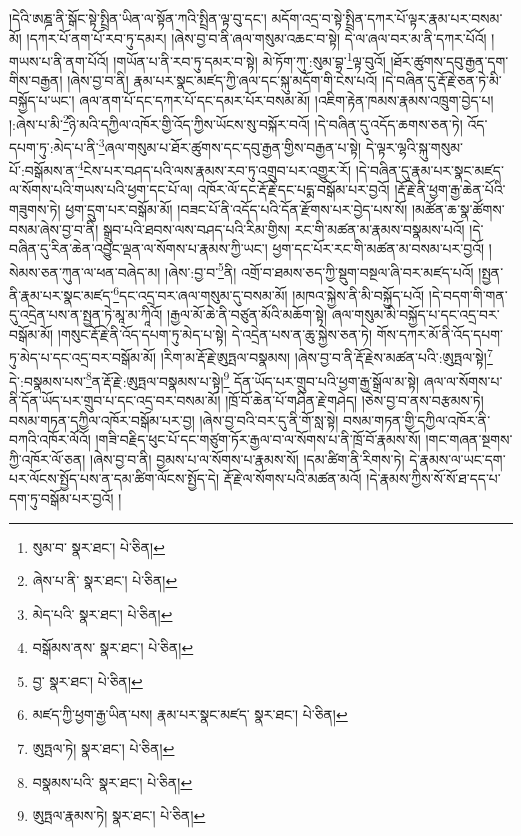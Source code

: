 །དེའི་ཨཎྜ་ནི་སྒོང་སྟེ་སྤྲིན་ཡིན་ལ་སྟོན་ཀའི་སྤྲིན་ལྟ་བུ་དང་། མདོག་འདྲ་བ་སྟེ་སྤྲིན་དཀར་པོ་ལྟར་རྣམ་པར་བསམ་མོ། །དཀར་པོ་ནག་པོ་རབ་ཏུ་དམར། །ཞེས་བྱ་བ་ནི་ཞལ་གསུམ་འཆང་བ་སྟེ། དེ་ལ་ཞལ་བར་མ་ནི་དཀར་པོའོ། །གཡས་པ་ནི་ནག་པོའོ། །གཡོན་པ་ནི་རབ་ཏུ་དམར་བ་སྟེ། མེ་ཏོག་ཀུ་:སུམ་བྷ་\footnote{སུམ་བ་  སྣར་ཐང་།  པེ་ཅིན། }ལྟ་བུའོ། །ཐོར་ཚུགས་དབུ་རྒྱན་དག་གིས་བརྒྱན། །ཞེས་བྱ་བ་ནི། རྣམ་པར་སྣང་མཛད་ཀྱི་ཞལ་དང་སྐུ་མདོག་གི་ངེས་པའོ། །དེ་བཞིན་དུ་རྡོ་རྗེ་ཅན་ཏེ་མི་བསྐྱོད་པ་ཡང་། ཞལ་ནག་པོ་དང་དཀར་པོ་དང་དམར་པོར་བསམ་མོ། །འཇིག་རྟེན་ཁམས་རྣམས་འཁྲུག་བྱེད་པ། །:ཞེས་པ་མི་\footnote{ཞེས་པ་ནི་  སྣར་ཐང་།  པེ་ཅིན། }ཉི་མའི་དཀྱིལ་འཁོར་གྱི་འོད་ཀྱིས་ཡོངས་སུ་བསྐོར་བའོ། །དེ་བཞིན་དུ་འདོད་ཆགས་ཅན་ཏེ། འོད་དཔག་ཏུ་:མེད་པ་ནི་\footnote{མེད་པའི་  སྣར་ཐང་།  པེ་ཅིན། }ཞལ་གསུམ་པ་ཐོར་ཚུགས་དང་དབུ་རྒྱན་གྱིས་བརྒྱན་པ་སྟེ། དེ་ལྟར་ལྷའི་སྐུ་གསུམ་པོ་:བསྒོམས་ན་\footnote{བསྒོམས་ནས་  སྣར་ཐང་།  པེ་ཅིན། }ངེས་པར་བཤད་པའི་ལས་རྣམས་རབ་ཏུ་འགྲུབ་པར་འགྱུར་རོ། །དེ་བཞིན་དུ་རྣམ་པར་སྣང་མཛད་ལ་སོགས་པའི་གཡས་པའི་ཕྱག་དང་པོ་ལ། འཁོར་ལོ་དང་རྡོ་རྗེ་དང་པདྨ་བསྒོམ་པར་བྱའོ། །རྡོ་རྗེ་ནི་ཕྱག་རྒྱ་ཆེན་པོའི་གཟུགས་ཏེ། ཕྱག་དྲུག་པར་བསྒོམ་མོ། །བཟང་པོ་ནི་འདོད་པའི་དོན་རྫོགས་པར་བྱེད་པས་སོ། །མཚོན་ཆ་སྣ་ཚོགས་བསམ་ཞེས་བྱ་བ་ནི། སྒྲུབ་པའི་ཐབས་ལས་བཤད་པའི་རིམ་གྱིས། རང་གི་མཚན་མ་རྣམས་བསྣམས་པའོ། །དེ་བཞིན་དུ་རིན་ཆེན་འབྱུང་ལྡན་ལ་སོགས་པ་རྣམས་ཀྱི་ཡང་། ཕྱག་དང་པོར་རང་གི་མཚན་མ་བསམ་པར་བྱའོ། །སེམས་ཅན་ཀུན་ལ་ཕན་བཞེད་མ། །ཞེས་:བྱ་བ་\footnote{བྱ་  སྣར་ཐང་།  པེ་ཅིན། }ནི། འགྲོ་བ་ཐམས་ཅད་ཀྱི་སྡུག་བསྔལ་ཞི་བར་མཛད་པའོ། །སྤྱན་ནི་རྣམ་པར་སྣང་མཛད་\footnote{མཛད་ཀྱི་ཕྱག་རྒྱ་ཡིན་པས། རྣམ་པར་སྣང་མཛད་  སྣར་ཐང་།  པེ་ཅིན། }དང་འདྲ་བར་ཞལ་གསུམ་དུ་བསམ་མོ། །མཁའ་སྐྱེས་ནི་མི་བསྐྱོད་པའོ། །དེ་བདག་གི་གན་དུ་འདྲེན་པས་ན་སྤྱན་ཏེ་མཱ་མ་ཀཱིའོ། །རྒྱལ་མོ་ཆེ་ནི་བཙུན་མོའི་མཆོག་སྟེ། ཞལ་གསུམ་མི་བསྐྱོད་པ་དང་འདྲ་བར་བསྒོམ་མོ། །གསུང་རྡོ་རྗེ་ནི་འོད་དཔག་ཏུ་མེད་པ་སྟེ། དེ་འདྲེན་པས་ན་ཆུ་སྐྱེས་ཅན་ཏེ། གོས་དཀར་མོ་ནི་འོད་དཔག་ཏུ་མེད་པ་དང་འདྲ་བར་བསྒོམ་མོ། །རིག་མ་རྡོ་རྗེ་ཨུཏྤལ་བསྣམས། །ཞེས་བྱ་བ་ནི་རྡོ་རྗེས་མཚན་པའི་:ཨུཏྤལ་སྟེ།\footnote{ཨུཏྤལ་ཏེ།  སྣར་ཐང་།  པེ་ཅིན། } དེ་:བསྣམས་པས་\footnote{བསྣམས་པའི་  སྣར་ཐང་།  པེ་ཅིན། }ན་རྡོ་རྗེ་:ཨུཏྤལ་བསྣམས་པ་སྟེ།\footnote{ཨུཏྤལ་རྣམས་ཏེ།  སྣར་ཐང་།  པེ་ཅིན། } དོན་ཡོད་པར་གྲུབ་པའི་ཕྱག་རྒྱ་སྒྲོལ་མ་སྟེ། ཞལ་ལ་སོགས་པ་ནི་དོན་ཡོད་པར་གྲུབ་པ་དང་འདྲ་བར་བསམ་མོ། །ཁྲོ་བོ་ཆེན་པོ་གཤིན་རྗེ་གཤེད། །ཅེས་བྱ་བ་ནས་བརྩམས་ཏེ། བསམ་གཏན་དཀྱིལ་འཁོར་བསྒོམ་པར་བྱ། །ཞེས་བྱ་བའི་བར་དུ་ནི་གོ་སླ་སྟེ། བསམ་གཏན་གྱི་དཀྱིལ་འཁོར་ནི་བཀའི་འཁོར་ལོའོ། །གཟི་བརྗིད་ཕུང་པོ་དང་གཙུག་ཏོར་རྒྱལ་བ་ལ་སོགས་པ་ནི་ཁྲོ་བོ་རྣམས་སོ། །གང་གཞན་སྔགས་ཀྱི་འཁོར་ལོ་ཅན། །ཞེས་བྱ་བ་ནི། བྱམས་པ་ལ་སོགས་པ་རྣམས་སོ། །དམ་ཚིག་ནི་རིགས་ཏེ། དེ་རྣམས་ལ་ཡང་དག་པར་ལོངས་སྤྱོད་པས་ན་དམ་ཚིག་ལོངས་སྤྱོད་དེ། རྡོ་རྗེ་ལ་སོགས་པའི་མཚན་མའོ། །དེ་རྣམས་ཀྱིས་སོ་སོ་ཐ་དད་པ་དག་ཏུ་བསྒོམ་པར་བྱའོ། །
